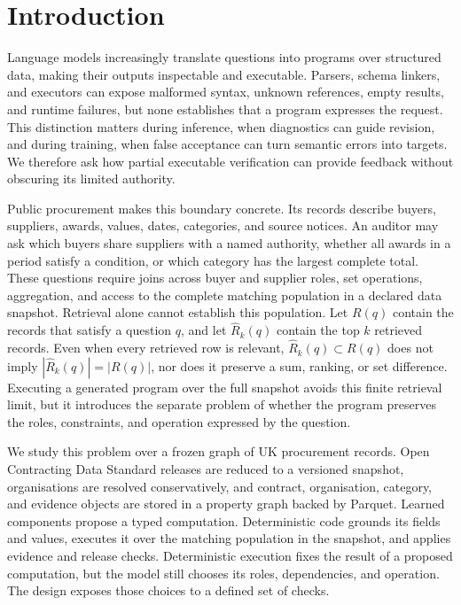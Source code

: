 \section{Introduction}
\label{sec:intro}

Language models increasingly translate questions into programs over structured data, making their
outputs inspectable and executable.  Parsers, schema linkers, and executors can expose malformed
syntax, unknown references, empty results, and runtime failures, but none establishes that a
program expresses the request.  This distinction matters during inference, when diagnostics can
guide revision, and during training, when false acceptance can turn semantic errors into targets.
We therefore ask how partial executable verification can provide feedback without obscuring its
limited authority.

Public procurement makes this boundary concrete.  Its records describe buyers, suppliers, awards,
values, dates, categories, and source notices.  An auditor may ask which buyers share suppliers
with a named authority, whether all awards in a period satisfy a condition, or which category has
the largest complete total.  These questions require joins across buyer and supplier roles, set operations,
aggregation, and access to the complete matching population in a declared data snapshot.
Retrieval alone cannot establish this population.  Let $R(q)$ contain the records that satisfy a
question $q$, and let $\widehat{R}_k(q)$ contain the top $k$ retrieved records.  Even when every
retrieved row is relevant, $\widehat{R}_k(q)\subset R(q)$ does not imply
$|\widehat{R}_k(q)|=|R(q)|$, nor does it preserve a sum, ranking, or set difference.  Executing a
generated program over the full snapshot avoids this finite retrieval limit, but it introduces the
separate problem of whether the program preserves the roles, constraints, and operation expressed
by the question.

We study this problem over a frozen graph of UK procurement records.  Open Contracting
Data Standard releases are reduced to a versioned snapshot, organisations are resolved
conservatively, and contract, organisation, category, and evidence objects are stored in a property
graph backed by Parquet.  Learned components propose a typed computation.  Deterministic
code grounds its fields and values, executes it over the matching population in the snapshot, and
applies evidence and release checks.  Deterministic execution fixes the result of a proposed
computation, but the model still chooses its roles, dependencies, and operation.  The design exposes
those choices to a defined set of checks.

